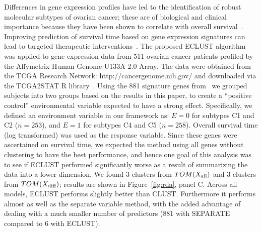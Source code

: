 Differences in gene expression profiles have led to the identification of robust molecular subtypes of ovarian cancer; these are of biological and clinical importance because they have been shown to correlate with overall survival~\citep{tothill2008novel}. Improving prediction of survival time based on gene expression signatures can lead to targeted therapeutic interventions~\citep{helland2011deregulation}. The proposed ECLUST algorithm was applied to gene expression data from 511 ovarian cancer patients profiled by the Affymetrix Human Genome U133A 2.0 Array. The data were obtained from the TCGA Research Network: http://cancergenome.nih.gov/ and downloaded via the TCGA2STAT R library~\citep{tcga2stat}. Using the 881 signature genes from~\cite{helland2011deregulation} we grouped subjects into two groups based on the results in this paper, to create a ``positive control'' environmental variable expected to have a strong effect. Specifically, we defined an environment variable in our framework as: $E=0$ for subtypes C1 and C2 ($n = 253$), and $E=1$ for subtypes C4 and C5 ($n = 258$). Overall survival time (log transformed) was used as the response variable. Since these genes were ascertained on survival time, we expected the method using all genes without clustering to have the best performance, and hence one goal of this analysis was to see if ECLUST performed significantly worse as a result of summarizing the data into a lower dimension. We found 3 clusters from $TOM(X_{\textrm{{all}}})$ and 3 clusters from $TOM(X_{\textrm{{diff}}})$;  results are shown in Figure~\ref{fig:rda}, panel C. Across all models, ECLUST performs slightly better than CLUST. Furthermore it performs almost as well as the separate variable method, with the added advantage of dealing with a much smaller number of predictors (881 with SEPARATE compared to 6 with ECLUST).  

